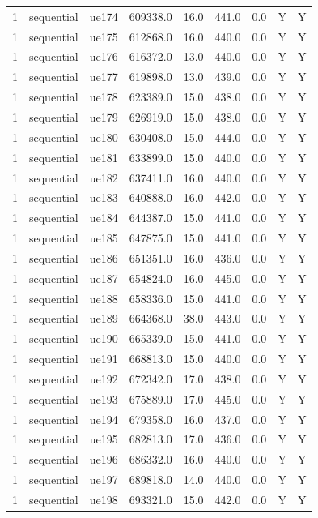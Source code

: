 \begin{table}[ht]
\begin{tabular}{|c|c|c|c|c|c|c|c|c|}
1 & sequential & ue174 & 609338.0 & 16.0 & 441.0 & 0.0 & Y & Y \\
1 & sequential & ue175 & 612868.0 & 16.0 & 440.0 & 0.0 & Y & Y \\
1 & sequential & ue176 & 616372.0 & 13.0 & 440.0 & 0.0 & Y & Y \\
1 & sequential & ue177 & 619898.0 & 13.0 & 439.0 & 0.0 & Y & Y \\
1 & sequential & ue178 & 623389.0 & 15.0 & 438.0 & 0.0 & Y & Y \\
1 & sequential & ue179 & 626919.0 & 15.0 & 438.0 & 0.0 & Y & Y \\
1 & sequential & ue180 & 630408.0 & 15.0 & 444.0 & 0.0 & Y & Y \\
1 & sequential & ue181 & 633899.0 & 15.0 & 440.0 & 0.0 & Y & Y \\
1 & sequential & ue182 & 637411.0 & 16.0 & 440.0 & 0.0 & Y & Y \\
1 & sequential & ue183 & 640888.0 & 16.0 & 442.0 & 0.0 & Y & Y \\
1 & sequential & ue184 & 644387.0 & 15.0 & 441.0 & 0.0 & Y & Y \\
1 & sequential & ue185 & 647875.0 & 15.0 & 441.0 & 0.0 & Y & Y \\
1 & sequential & ue186 & 651351.0 & 16.0 & 436.0 & 0.0 & Y & Y \\
1 & sequential & ue187 & 654824.0 & 16.0 & 445.0 & 0.0 & Y & Y \\
1 & sequential & ue188 & 658336.0 & 15.0 & 441.0 & 0.0 & Y & Y \\
1 & sequential & ue189 & 664368.0 & 38.0 & 443.0 & 0.0 & Y & Y \\
1 & sequential & ue190 & 665339.0 & 15.0 & 441.0 & 0.0 & Y & Y \\
1 & sequential & ue191 & 668813.0 & 15.0 & 440.0 & 0.0 & Y & Y \\
1 & sequential & ue192 & 672342.0 & 17.0 & 438.0 & 0.0 & Y & Y \\
1 & sequential & ue193 & 675889.0 & 17.0 & 445.0 & 0.0 & Y & Y \\
1 & sequential & ue194 & 679358.0 & 16.0 & 437.0 & 0.0 & Y & Y \\
1 & sequential & ue195 & 682813.0 & 17.0 & 436.0 & 0.0 & Y & Y \\
1 & sequential & ue196 & 686332.0 & 16.0 & 440.0 & 0.0 & Y & Y \\
1 & sequential & ue197 & 689818.0 & 14.0 & 440.0 & 0.0 & Y & Y \\
1 & sequential & ue198 & 693321.0 & 15.0 & 442.0 & 0.0 & Y & Y \\

\end{tabular}
\end{table}

